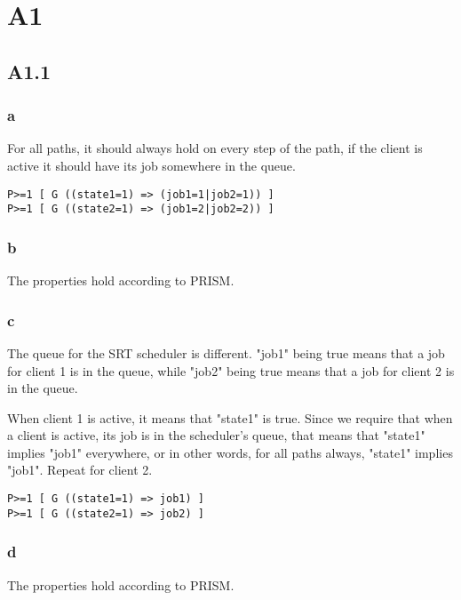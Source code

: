 
\section{A1}

\subsection{A1.1}

\subsubsection{a}

For all paths, it should always hold on every step of the path,
if the client is active it should have its job somewhere in the queue.

\begin{verbatim}
P>=1 [ G ((state1=1) => (job1=1|job2=1)) ]
P>=1 [ G ((state2=1) => (job1=2|job2=2)) ]
\end{verbatim}

\subsubsection{b}

The properties hold according to PRISM.

\subsubsection{c}

The queue for the SRT scheduler is different.
"job1" being true means that a job for
client 1 is in the queue,
while "job2" being true means that a job for
client 2 is in the queue.

When client 1 is active,
it means that "state1" is true.
Since we require that when a client is active,
its job is in the scheduler's queue,
that means that "state1" implies "job1"
everywhere, or in other words, for all paths
always, "state1" implies "job1".
Repeat for client 2.

\begin{verbatim}
P>=1 [ G ((state1=1) => job1) ]
P>=1 [ G ((state2=1) => job2) ]
\end{verbatim}

\subsubsection{d}

The properties hold according to PRISM.

